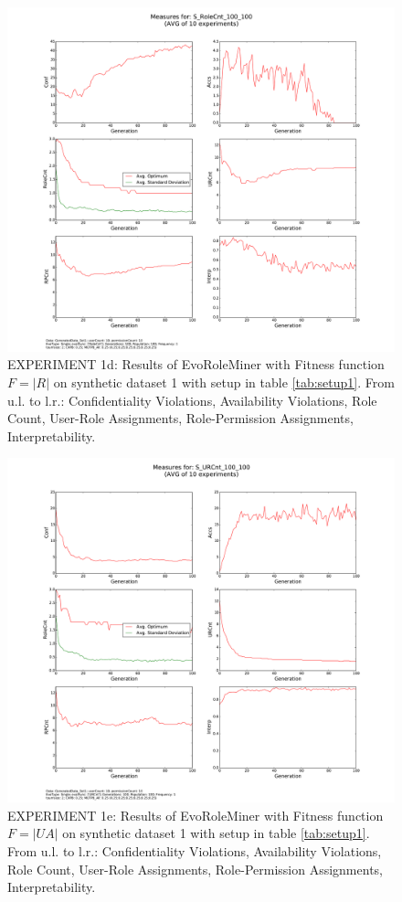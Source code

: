     \begin{figure}[H]
        \centering
        \includegraphics[scale=0.33, trim=4cm 2cm 4cm 0cm, clip=true]{./Figures/exp1roleCnt}
        \caption{EXPERIMENT 1d: Results of EvoRoleMiner with Fitness function $F=|R|$ on synthetic dataset 1 with setup in table \ref{tab:setup1}. From u.l. to l.r.: Confidentiality Violations, Availability Violations, Role Count, User-Role Assignments, Role-Permission Assignments, Interpretability.}
        \label{fig:exp1roleCnt}
    \end{figure}
    
    \begin{figure}[H]
        \centering
        \includegraphics[scale=0.33, trim=4cm 2cm 4cm 0cm, clip=true]{./Figures/exp1urCnt}
        \caption{EXPERIMENT 1e: Results of EvoRoleMiner with Fitness function $F=|UA|$ on synthetic dataset 1 with setup in table \ref{tab:setup1}. From u.l. to l.r.: Confidentiality Violations, Availability Violations, Role Count, User-Role Assignments, Role-Permission Assignments, Interpretability.}
        \label{fig:exp1urCnt}
    \end{figure}
    
